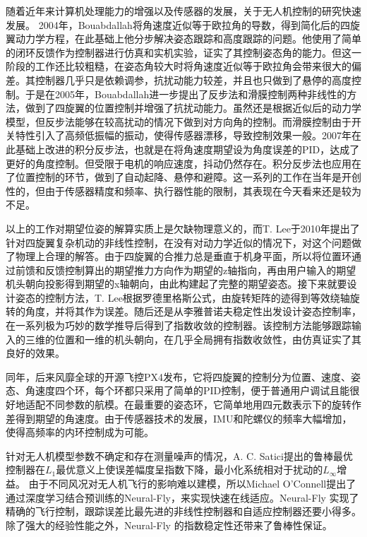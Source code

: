 随着近年来计算机处理能力的增强以及传感器的发展，关于无人机控制的研究快速发展。
2004年，Bouabdallah将角速度近似等于欧拉角的导数，得到简化后的四旋翼动力学方程，在此基础上他分步解决姿态跟踪和高度跟踪的问题。他使用了简单的闭环反馈作为控制器进行仿真和实机实验，证实了其控制姿态角的能力\cite{boua2007}。但这一阶段的工作还比较粗糙，在姿态角较大时将角速度近似等于欧拉角会带来很大的偏差。其控制器几乎只是依赖调参，抗扰动能力较差，并且也只做到了悬停的高度控制。于是在2005年，Bouabdallah进一步提出了反步法和滑膜控制两种非线性的方法\cite{boua2005}，做到了四旋翼的位置控制并增强了抗扰动能力。虽然还是根据近似后的动力学模型，但反步法能够在较高扰动的情况下做到对方向角的控制。而滑膜控制由于开关特性引入了高频低振幅的振动，使得传感器漂移，导致控制效果一般。2007年在此基础上改进的积分反步法\cite{bouabdallah2007full}，也就是在将角速度期望设为角度误差的PID，达成了更好的角度控制。但受限于电机的响应速度，抖动仍然存在。积分反步法也应用在了位置控制的环节，做到了自动起降、悬停和避障。这一系列的工作在当年是开创性的，但由于传感器精度和频率、执行器性能的限制，其表现在今天看来还是较为不足。


以上的工作对期望位姿的解算实质上是欠缺物理意义的，而T. Lee于2010年提出了针对四旋翼复杂机动的非线性控制\cite{Lee2010}，在没有对动力学近似的情况下，对这个问题做了物理上合理的解答。由于四旋翼的合推力总是垂直于机身平面，所以将位置环通过前馈和反馈控制算出的期望推力方向作为期望的z轴指向，再由用户输入的期望机头朝向投影得到期望的x轴朝向，由此构建起了完整的期望姿态。接下来就要设计姿态的控制方法，T. Lee根据罗德里格斯公式，由旋转矩阵的迹得到等效绕轴旋转的角度，并将其作为误差。随后还是从李雅普诺夫稳定性出发设计姿态控制率，在一系列极为巧妙的数学推导后得到了指数收敛的控制器。该控制方法能够跟踪输入的三维的位置和一维的机头朝向，在几乎全局拥有指数收敛性，由仿真证实了其良好的效果。

同年，后来风靡全球的开源飞控PX4发布\cite{brescianini2013nonlinear}，它将四旋翼的控制分为位置、速度、姿态、角速度四个环，每个环都只采用了简单的PID控制，便于普通用户调试且能很好地适配不同参数的航模。在最重要的姿态环，它简单地用四元数表示下的旋转作差得到期望的角速度。由于传感器技术的发展，IMU和陀螺仪的频率大幅增加，使得高频率的内环控制成为可能。

针对无人机模型参数不确定和存在测量噪声的情况，A. C. Satici提出的鲁棒最优控制器在$L_1$最优意义上使误差幅度呈指数下降，最小化系统相对于扰动的$L_\infty$增益\cite{satici2013robust}。
由于不同风况对无人机飞行的影响难以建模，所以Michael O'Connell提出了通过深度学习结合预训练的Neural-Fly\cite{o2022neural}，来实现快速在线适应。Neural-Fly 实现了精确的飞行控制，跟踪误差比最先进的非线性控制器和自适应控制器还要小得多。除了强大的经验性能之外，Neural-Fly 的指数稳定性还带来了鲁棒性保证。

